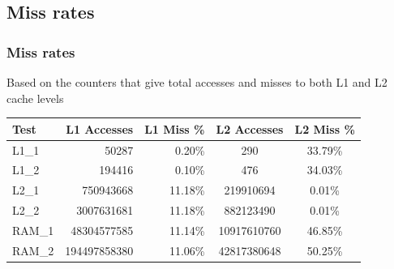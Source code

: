 \documentclass{beamer}
\begin{document}
\subsection{Miss rates}
\begin{frame}
	\frametitle{Miss rates}%

	Based on the counters that give total accesses and misses to both L1 and L2 cache levels

	\begin{table}[!htp]
		\begin{center}
		{\small
			\begin{tabular}{|l|r|r|c|c|}
				
				\hline
				Test	&	L1 Accesses		&	L1 Miss \%	&	L2 Accesses		&	L2 Miss \%	\\
				\hline
				L1\_1	&	50287			&	0.20\%		&	290				&	33.79\%		\\
				L1\_2	&	194416			&	0.10\%		&	476				&	34.03\%		\\
				L2\_1	&	750943668		&	11.18\%		&	219910694		&	0.01\%		\\
				L2\_2	&	3007631681		&	11.18\%		&	882123490		&	0.01\%		\\
				RAM\_1	&	48304577585		&	11.14\%		&	10917610760		&	46.85\%		\\
				RAM\_2	&	194497858380	&	11.06\%		&	42817380648		&	50.25\%		\\
				\hline
			\end{tabular}
		}
		\end{center}
	\end{table}
\end{frame}
\end{document}
